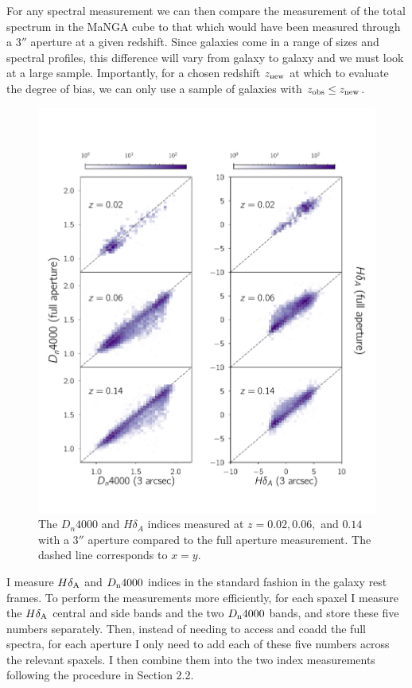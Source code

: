 For any spectral measurement we can then compare the measurement
of the total spectrum in the MaNGA cube to that which would have been
measured through a 3$''$ aperture at a given redshift. Since galaxies
come in a range of sizes and spectral profiles, this difference
will vary from galaxy to galaxy and we must look at a large sample.
Importantly, for a chosen redshift $z_{\rm new}$ at which to evaluate
the degree of bias, we can only use a sample of galaxies with 
$z_{\rm obs} \le z_{\rm new}$.

\begin{figure}
\includegraphics[width=\textwidth]{figures/full_aperture_comparisons.pdf}
\caption[The $D_{n}4000$, $h\delta_{A}$ indices measured at 
$z = 0.02,0.06,0.14$ with a $3''$ aperture compared to the full aperture measurement]
{ The $D_{n}4000$ and $H\delta_{A}$ indices measured 
at $z = 0.02,0.06,$ and $0.14$ with a $3''$ aperture 
compared to the full aperture measurement. The dashed line corresponds
to $x=y$.
\label{fig:redshift_comparison}}
\end{figure}


I measure $H\delta_{\rm A}$ and $D_{\rm n}4000$ indices in the standard
fashion in the galaxy rest frames. To perform the measurements more 
efficiently, for each spaxel I measure the $H\delta_{\rm A}$ central
and side bands and the two $D_{\rm n}4000$ bands, and store these five
numbers separately. Then, instead of needing to access and coadd the full
spectra, for each aperture I only need to add each of these five numbers
across the relevant spaxels. I then combine them into the two index
measurements following the procedure in Section 2.2.

